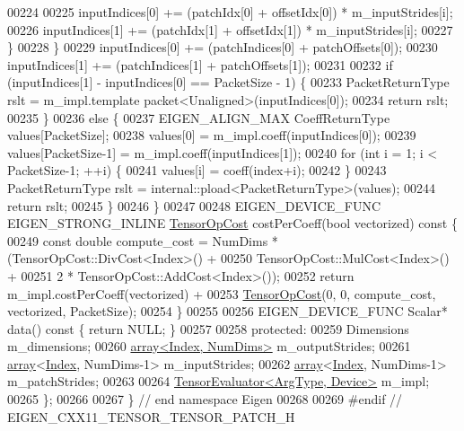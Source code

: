 \begin{DoxyCode}
00224 
00225         inputIndices[0] += (patchIdx[0] + offsetIdx[0]) * m\_inputStrides[i];
00226         inputIndices[1] += (patchIdx[1] + offsetIdx[1]) * m\_inputStrides[i];
00227       \}
00228     \}
00229     inputIndices[0] += (patchIndices[0] + patchOffsets[0]);
00230     inputIndices[1] += (patchIndices[1] + patchOffsets[1]);
00231 
00232     \textcolor{keywordflow}{if} (inputIndices[1] - inputIndices[0] == PacketSize - 1) \{
00233       PacketReturnType rslt = m\_impl.template packet<Unaligned>(inputIndices[0]);
00234       \textcolor{keywordflow}{return} rslt;
00235     \}
00236     \textcolor{keywordflow}{else} \{
00237       EIGEN\_ALIGN\_MAX CoeffReturnType values[PacketSize];
00238       values[0] = m\_impl.coeff(inputIndices[0]);
00239       values[PacketSize-1] = m\_impl.coeff(inputIndices[1]);
00240       \textcolor{keywordflow}{for} (\textcolor{keywordtype}{int} i = 1; i < PacketSize-1; ++i) \{
00241         values[i] = coeff(index+i);
00242       \}
00243       PacketReturnType rslt = internal::pload<PacketReturnType>(values);
00244       \textcolor{keywordflow}{return} rslt;
00245     \}
00246   \}
00247 
00248   EIGEN\_DEVICE\_FUNC EIGEN\_STRONG\_INLINE \hyperlink{class_eigen_1_1_tensor_op_cost}{TensorOpCost} costPerCoeff(\textcolor{keywordtype}{bool} vectorized)\textcolor{keyword}{ const }\{
00249     \textcolor{keyword}{const} \textcolor{keywordtype}{double} compute\_cost = NumDims * (TensorOpCost::DivCost<Index>() +
00250                                            TensorOpCost::MulCost<Index>() +
00251                                            2 * TensorOpCost::AddCost<Index>());
00252     \textcolor{keywordflow}{return} m\_impl.costPerCoeff(vectorized) +
00253            \hyperlink{class_eigen_1_1_tensor_op_cost}{TensorOpCost}(0, 0, compute\_cost, vectorized, PacketSize);
00254   \}
00255 
00256   EIGEN\_DEVICE\_FUNC Scalar* data()\textcolor{keyword}{ const }\{ \textcolor{keywordflow}{return} NULL; \}
00257 
00258  \textcolor{keyword}{protected}:
00259   Dimensions m\_dimensions;
00260   \hyperlink{class_eigen_1_1array}{array<Index, NumDims>} m\_outputStrides;
00261   \hyperlink{class_eigen_1_1array}{array}<\hyperlink{namespace_eigen_a62e77e0933482dafde8fe197d9a2cfde}{Index}, NumDims-1> m\_inputStrides;
00262   \hyperlink{class_eigen_1_1array}{array}<\hyperlink{namespace_eigen_a62e77e0933482dafde8fe197d9a2cfde}{Index}, NumDims-1> m\_patchStrides;
00263 
00264   \hyperlink{struct_eigen_1_1_tensor_evaluator}{TensorEvaluator<ArgType, Device>} m\_impl;
00265 \};
00266 
00267 \} \textcolor{comment}{// end namespace Eigen}
00268 
00269 \textcolor{preprocessor}{#endif // EIGEN\_CXX11\_TENSOR\_TENSOR\_PATCH\_H}
\end{DoxyCode}

